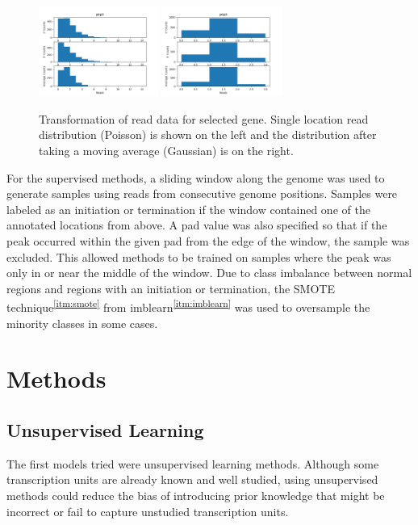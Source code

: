 \documentclass{article}
\newcommand{\cited}[1]{\textsuperscript{\ref{itm:#1}}}
\begin{document}
\begin{figure}[H]
    \centering
    \includegraphics[width=0.35\textwidth]{pepA.png}
    \includegraphics[width=0.35\textwidth]{pepA_ma.png}
    \caption{Transformation of read data for selected gene.  Single location read distribution (Poisson) is shown on the left and the distribution after taking a moving average (Gaussian) is on the right.}
    \label{fig:distribution}
\end{figure}

For the supervised methods, a sliding window along the genome was used to generate samples using reads from consecutive genome positions.  Samples were labeled as an initiation or termination if the window contained one of the annotated locations from above.  A pad value was also specified so that if the peak occurred within the given pad from the edge of the window, the sample was excluded.  This allowed methods to be trained on samples where the peak was only in or near the middle of the window.  Due to class imbalance between normal regions and regions with an initiation or termination, the SMOTE technique\cited{smote} from imblearn\cited{imblearn} was used to oversample the minority classes in some cases.

\section{Methods}

\subsection{Unsupervised Learning}
The first models tried were unsupervised learning methods.  Although some transcription units are already known and well studied, using unsupervised methods could reduce the bias of introducing prior knowledge that might be incorrect or fail to capture unstudied transcription units.
\end{document}
